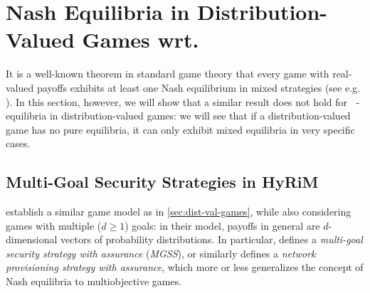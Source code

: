 \documentclass[a4paper]{scrreprt}
\DeclareMathOperator{\leqtail}{\leq_{\text{tail}}}
\begin{document}
%    

    \section{Nash Equilibria in Distribution-Valued Games wrt. $\leqtail$}
    It is a well-known theorem in standard game theory that every game with real-valued payoffs exhibits at least one Nash equilibrium in mixed strategies (see e.g. \cite{bib:matsumotoGameTheory}).
    In this section, however, we will show that a similar result does not hold for $\leqtail$-equilibria in distribution-valued games: we will see that if a distribution-valued game has no pure equilibria, it can only exhibit mixed equilibria in very specific cases.
    
    \subsection{Multi-Goal Security Strategies in HyRiM}
    \cite{bib:rassGameRiskManagI,bib:rassGameRiskManagII} establish a similar game model as in \autoref{sec:dist-val-games}, while also considering games with multiple ($d \geq 1$) goals: in their model, payoffs in general are $d$-dimensional vectors of probability distributions.
    In particular, \cite{bib:rassGameRiskManagII} defines a \emph{multi-goal security strategy with assurance} (\emph{MGSS}), or similarly \cite{bib:rassGameTheoreticNWSecProv} defines a \emph{network provisioning strategy with assurance}, which more or less generalizes the concept of Nash equilibria to multiobjective games. 
    
\end{document}
